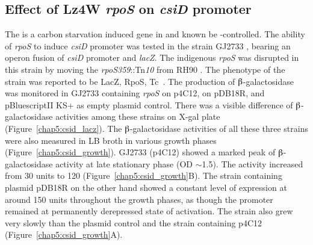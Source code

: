 \subsection{Effect of Lz4W \emph{rpoS} on \emph{csiD} promoter}

The  is a carbon starvation induced gene in  and
known be -controlled. The ability of \emph{rpoS}
to induce \emph{csiD} promoter was tested in the strain GJ2733
\citep[kind gift from J. Gowrishankar]{Rajkumari2001}, bearing an
operon fusion of \emph{csiD} promoter and \emph{lacZ}\@. The
indigenous \emph{rpoS} was disrupted in this strain by moving the
\emph{rpoS359}::Tn\emph{10} from RH90 \citep{Barth1995}. The
phenotype of the strain was reported to be LacZ\su{$-$},
RpoS\su{$-$}, Tc~\citep{Rajkumari2001}. The production of
$\betaup$-galac\-to\-sidase was monitored in GJ2733 containing
\emph{rpoS} on p4C12, \pasig{} on pDB18R, and
pBluescriptII KS+ as empty plasmid control. There was a visible
difference of $\betaup$-galactosidase activities among these
strains on X-gal plate (Figure~\ref{chap5:csid_lacz}). The
$\betaup$-galactosidase activities of all these three strains were
also measured in LB broth in various growth phases
(Figure~\ref{chap5:csid_growth}). GJ2733 (p4C12) showed a marked
peak of $\betaup$-galac\-to\-sidase activity at late stationary
phase (OD $\sim$1.5). The activity increased from 30
units to 120 (Figure~\ref{chap5:csid_growth}B). The strain
containing plasmid pDB18R on the other hand showed a constant
level of expression at around 150 units throughout the growth
phases, as though the promoter remained at permanently derepressed
state of activation. The strain also grew very slowly than the
plasmid control and the strain containing p4C12
(Figure~\ref{chap5:csid_growth}A).

